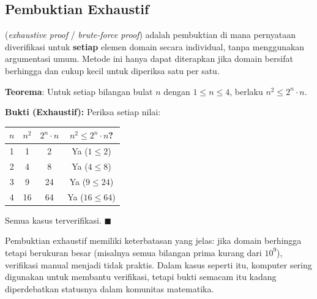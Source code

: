 \subsection{Pembuktian Exhaustif}

\begin{definisi}
 (\textit{exhaustive proof} / \textit{brute-force proof}) adalah pembuktian di mana pernyataan diverifikasi untuk \textbf{setiap} elemen domain secara individual, tanpa menggunakan argumentasi umum. Metode ini hanya dapat diterapkan jika domain bersifat berhingga dan cukup kecil untuk diperiksa satu per satu.
\end{definisi}

\begin{contoh}
\textbf{Teorema}: Untuk setiap bilangan bulat $n$ dengan $1 \leq n \leq 4$, berlaku $n^2 \leq 2^n \cdot n$.

\textbf{Bukti (Exhaustif):} Periksa setiap nilai:
\begin{center}
\renewcommand{\arraystretch}{1.2}
\begin{tabular}{|c|c|c|c|}
\hline
$n$ & $n^2$ & $2^n \cdot n$ & $n^2 \leq 2^n \cdot n$? \\ \hline
1 & 1 & 2 & Ya ($1 \leq 2$) \\ \hline
2 & 4 & 8 & Ya ($4 \leq 8$) \\ \hline
3 & 9 & 24 & Ya ($9 \leq 24$) \\ \hline
4 & 16 & 64 & Ya ($16 \leq 64$) \\ \hline
\end{tabular}
\end{center}

Semua kasus terverifikasi. $\blacksquare$
\end{contoh}

\begin{catatan}
Pembuktian exhaustif memiliki keterbatasan yang jelas: jika domain berhingga tetapi berukuran besar (misalnya semua bilangan prima kurang dari $10^9$), verifikasi manual menjadi tidak praktis. Dalam kasus seperti itu, komputer sering digunakan untuk membantu verifikasi, tetapi bukti semacam itu kadang diperdebatkan statusnya dalam komunitas matematika.
\end{catatan}
